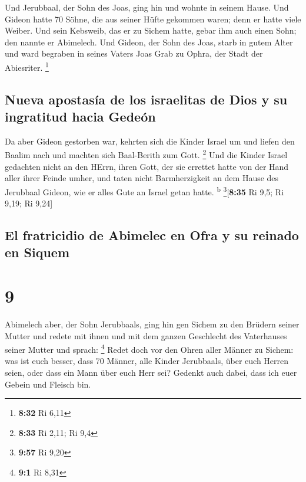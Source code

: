  Und Jerubbaal, der Sohn des Joas, ging hin und wohnte in
seinem Hause.  Und Gideon hatte 70 Söhne, die aus seiner
Hüfte gekommen waren; denn er hatte viele Weiber.  Und
sein Kebsweib, das er zu Sichem hatte, gebar ihm auch einen Sohn; den
nannte er Abimelech.  Und Gideon, der Sohn des Joas,
starb in gutem Alter und ward begraben in seines Vaters Joas Grab zu
Ophra, der Stadt der Abiesriter. \footnote{\textbf{8:32} Ri 6,11}

\hypertarget{nueva-apostasuxeda-de-los-israelitas-de-dios-y-su-ingratitud-hacia-gedeuxf3n}{%
\subsection{Nueva apostasía de los israelitas de Dios y su ingratitud
hacia
Gedeón}\label{nueva-apostasuxeda-de-los-israelitas-de-dios-y-su-ingratitud-hacia-gedeuxf3n}}

 Da aber Gideon gestorben war, kehrten sich die Kinder
Israel um und liefen den Baalim nach und machten sich Baal-Berith zum
Gott. \footnote{\textbf{8:33} Ri 2,11; Ri 9,4}  Und die
Kinder Israel gedachten nicht an den HErrn, ihren Gott, der sie errettet
hatte von der Hand aller ihrer Feinde umher,  und taten
nicht Barmherzigkeit an dem Hause des Jerubbaal Gideon, wie er alles
Gute an Israel getan hatte. \textsuperscript{b}
\footnote{\textbf{9:57} Ri 9,20}{[}\textbf{8:35} Ri 9,5; Ri 9,19; Ri
9,24{]}

\hypertarget{el-fratricidio-de-abimelec-en-ofra-y-su-reinado-en-siquem}{%
\subsection{El fratricidio de Abimelec en Ofra y su reinado en
Siquem}\label{el-fratricidio-de-abimelec-en-ofra-y-su-reinado-en-siquem}}

\hypertarget{section-8}{%
\section{9}\label{section-8}}

 Abimelech aber, der Sohn Jerubbaals, ging hin gen Sichem
zu den Brüdern seiner Mutter und redete mit ihnen und mit dem ganzen
Geschlecht des Vaterhauses seiner Mutter und sprach: \footnote{\textbf{9:1}
  Ri 8,31}  Redet doch vor den Ohren aller Männer zu
Sichem: was ist euch besser, dass 70 Männer, alle Kinder Jerubbaals,
über euch Herren seien, oder dass ein Mann über euch Herr sei? Gedenkt
auch dabei, dass ich euer Gebein und Fleisch bin.

